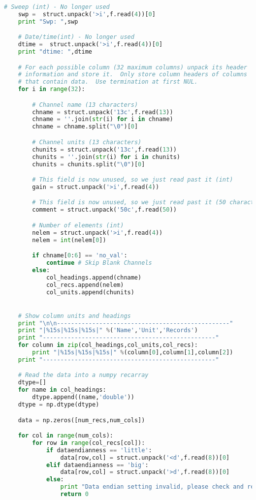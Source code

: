\begin{lstlisting}[language=Python]
    # Sweep (int) - No longer used
    swp =  struct.unpack('>i',f.read(4))[0]
    print "Swp: ",swp

    # Date/time(int) - No longer used
    dtime =  struct.unpack('>i',f.read(4))[0]
    print "dtime: ",dtime

    # For each possible column (32 maximum columns) unpack its header
    # information and store it.  Only store column headers of columns
    # that contain data.  Use termination at first NUL.
    for i in range(32):

        # Channel name (13 characters)
        chname = struct.unpack('13c',f.read(13))
        chname = ''.join(str(i) for i in chname)
        chname = chname.split("\0")[0]

        # Channel units (13 characters)
        chunits = struct.unpack('13c',f.read(13))
        chunits = ''.join(str(i) for i in chunits)
        chunits = chunits.split("\0")[0]

        # This field is now unused, so we just read past it (int)
        gain = struct.unpack('>i',f.read(4))

        # This field is now unused, so we just read past it (50 characters)
        comment = struct.unpack('50c',f.read(50))

        # Number of elements (int)
        nelem = struct.unpack('>i',f.read(4))
        nelem = int(nelem[0])

        if chname[0:6] == 'no_val':
            continue # Skip Blank Channels
        else:
            col_headings.append(chname)
            col_recs.append(nelem)
            col_units.append(chunits)


    # Show column units and headings
    print "\n\n-------------------------------------------------"
    print "|%15s|%15s|%15s|" %('Name','Unit','Records')
    print "-------------------------------------------------"
    for column in zip(col_headings,col_units,col_recs):
        print "|%15s|%15s|%15s|" %(column[0],column[1],column[2])
    print "-------------------------------------------------"

    # Read the data into a numpy recarray
    dtype=[]
    for name in col_headings:
        dtype.append((name,'double'))
    dtype = np.dtype(dtype)

    data = np.zeros([num_recs,num_cols])

    for col in range(num_cols):
        for row in range(col_recs[col]):
            if dataendianness == 'little':
                data[row,col] = struct.unpack('<d',f.read(8))[0]
            elif dataendianness == 'big':
                data[row,col] = struct.unpack('>d',f.read(8))[0]
            else:
                print "Data endian setting invalid, please check and retry"
                return 0


\end{lstlisting}
